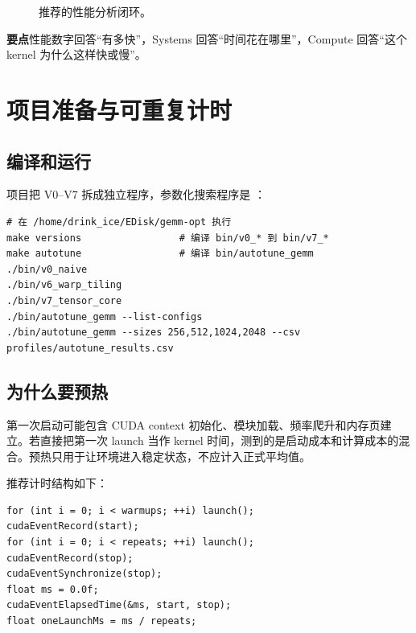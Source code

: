 \documentclass[UTF8,11pt,a4paper,fontset=fandol]{ctexart}
\newcommand{\code}[1]{\texttt{\detokenize{#1}}}
\newcommand{\takeaway}[1]{\par\noindent\colorbox{PaleBlue}{\parbox{\dimexpr\linewidth-2\fboxsep\relax}{\textbf{要点}\quad #1}}\par}
\begin{document}
\begin{figure}[H]\centering
{}
\caption{推荐的性能分析闭环。}
\end{figure}

\takeaway{性能数字回答“有多快”，Systems 回答“时间花在哪里”，Compute 回答“这个 kernel 为什么这样快或慢”。}

\section{项目准备与可重复计时}
\subsection{编译和运行}
项目把 V0--V7 拆成独立程序，参数化搜索程序是 \code{autotune_gemm}：
\begin{lstlisting}[style=shell]
# 在 /home/drink_ice/EDisk/gemm-opt 执行
make versions                 # 编译 bin/v0_* 到 bin/v7_*
make autotune                 # 编译 bin/autotune_gemm
./bin/v0_naive
./bin/v6_warp_tiling
./bin/v7_tensor_core
./bin/autotune_gemm --list-configs
./bin/autotune_gemm --sizes 256,512,1024,2048 --csv profiles/autotune_results.csv
\end{lstlisting}

\subsection{为什么要预热}
第一次启动可能包含 CUDA context 初始化、模块加载、频率爬升和内存页建立。若直接把第一次 launch 当作 kernel 时间，测到的是启动成本和计算成本的混合。预热只用于让环境进入稳定状态，不应计入正式平均值。

推荐计时结构如下：
\begin{lstlisting}[style=cuda]
for (int i = 0; i < warmups; ++i) launch();
cudaEventRecord(start);
for (int i = 0; i < repeats; ++i) launch();
cudaEventRecord(stop);
cudaEventSynchronize(stop);
float ms = 0.0f;
cudaEventElapsedTime(&ms, start, stop);
float oneLaunchMs = ms / repeats;
\end{lstlisting}
\end{document}
